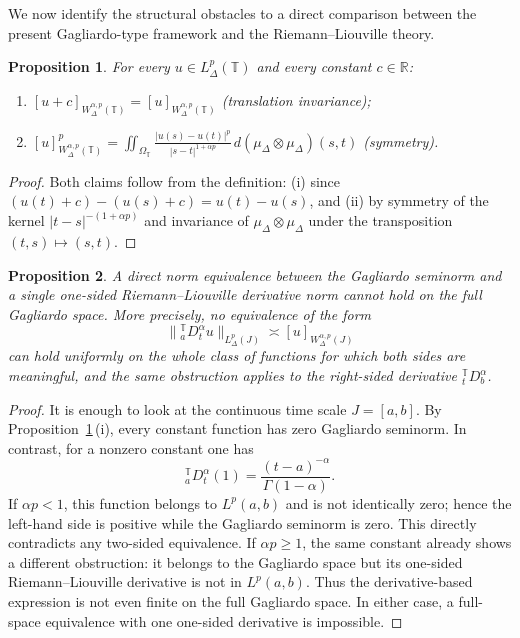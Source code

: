 \documentclass[11pt,a4paper]{article}
\numberwithin{equation}{section}
\newtheorem{proposition}[proposition]{Proposition}
\theoremstyle{definition}
\newcommand{\T}{\mathbb{T}}
\begin{document}
We now identify the structural obstacles to a direct comparison between the present Gagliardo-type framework and the Riemann--Liouville theory.

\begin{proposition}\label{prop:seminorm-structural-properties}
For every $u \in L^p_\Delta(\T)$ and every constant $c \in \mathbb{R}$:
\begin{enumerate}
\item[\textup{(i)}] $[u+c]_{W^{\alpha,p}_\Delta(\T)} = [u]_{W^{\alpha,p}_\Delta(\T)}$ \textup{(translation invariance)};
\item[\textup{(ii)}] $[u]_{W^{\alpha,p}_\Delta(\T)}^p = \displaystyle\iint_{\Omega_\T} \frac{|u(s)-u(t)|^p}{|s-t|^{1+\alpha p}}\,d(\mu_\Delta\otimes\mu_\Delta)(s,t)$ \textup{(symmetry)}.
\end{enumerate}
\end{proposition}

\begin{proof}
Both claims follow from the definition: (i) since $(u(t)+c)-(u(s)+c)=u(t)-u(s)$, and (ii) by symmetry of the kernel $|t-s|^{-(1+\alpha p)}$ and invariance of $\mu_\Delta\otimes\mu_\Delta$ under the transposition $(t,s)\mapsto(s,t)$.
\end{proof}

\begin{proposition}\label{prop:no-one-sided-comparison}
A direct norm equivalence between the Gagliardo seminorm and a single one-sided Riemann--Liouville derivative norm cannot hold on the full Gagliardo space. More precisely, no equivalence of the form
\[
\|{}^{\T}_{a}D_t^\alpha u\|_{L^p_\Delta(J)}
\asymp
[u]_{W^{\alpha,p}_\Delta(J)}
\]
can hold uniformly on the whole class of functions for which both sides are meaningful, and the same obstruction applies to the right-sided derivative ${}^{\T}_{t}D_b^\alpha$.
\end{proposition}

\begin{proof}
It is enough to look at the continuous time scale $J=[a,b]$. By Proposition~\ref{prop:seminorm-structural-properties}\,(i), every constant function has zero Gagliardo seminorm. In contrast, for a nonzero constant one has
\[
{}^{\T}_a D^\alpha_t(1)
= \frac{(t-a)^{-\alpha}}{\Gamma(1-\alpha)}.
\]
If $\alpha p<1$, this function belongs to $L^p(a,b)$ and is not identically zero; hence the left-hand side is positive while the Gagliardo seminorm is zero. This directly contradicts any two-sided equivalence. If $\alpha p\ge 1$, the same constant already shows a different obstruction: it belongs to the Gagliardo space but its one-sided Riemann--Liouville derivative is not in $L^p(a,b)$. Thus the derivative-based expression is not even finite on the full Gagliardo space. In either case, a full-space equivalence with one one-sided derivative is impossible.
\end{proof}
\end{document}

